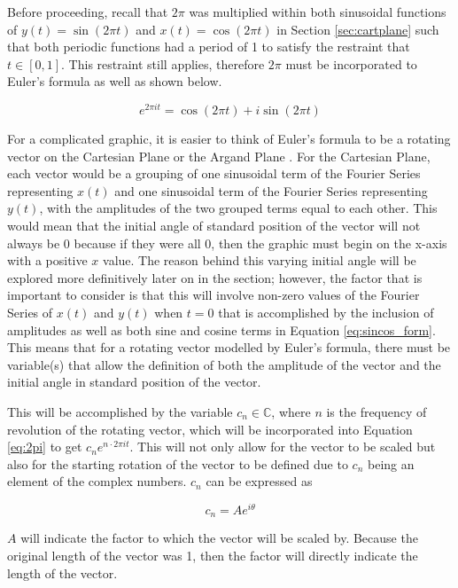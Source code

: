 \documentclass[letterpaper, 12pt]{article}
\begin{document}
Before proceeding, recall that \(2\pi\) was multiplied within
both sinusoidal functions of \(y(t) = \sin (2\pi t)\)
and \(x(t) = \cos (2\pi t)\) in Section \ref*{sec:cartplane}
such that both periodic functions had a period of 1
to satisfy the restraint that \(t \in [0, 1]\).
This restraint still applies, therefore \(2 \pi\)
must be incorporated to Euler's formula as well
as shown below.

\begin{equation}
    e^{2\pi it} = \cos(2\pi t) + i\sin(2\pi t)
    \label{eq:2pi}
\end{equation}

For a complicated graphic,
it is easier to think of Euler's formula to be a rotating vector on the
Cartesian Plane or the
Argand Plane \cite{sandersonWhatFourierSeries2019}.
For the Cartesian Plane, each vector would be a grouping of one
sinusoidal term of the Fourier Series representing \(x(t)\)
and one sinusoidal term of the Fourier Series representing \(y(t)\),
with the amplitudes of the two grouped terms equal to each other. This would mean
that the initial angle of standard position of the vector will not
always be 0 because if they were all 0, then the graphic must begin
on the x-axis with a positive \(x\) value. The reason behind
this varying initial angle will be explored more definitively later on
in the section; however, the factor that is important to consider
is that this will involve non-zero values of the Fourier Series of \(x(t)\) and \(y(t)\) when \(t=0\) that is accomplished by
the inclusion of amplitudes as well as both sine and cosine terms in Equation \ref*{eq:sincos_form}.
This means that for a rotating vector modelled by Euler's formula,
there must be variable(s) that allow the definition of both
the amplitude of the vector and the initial angle in standard
position of the vector.

This will be accomplished by the variable \(c_n \in \mathbb{C}\), where \(n\) is the frequency
of revolution of the rotating vector,
which will be incorporated into Equation \ref*{eq:2pi} to get \(c_n e^{n \cdot 2\pi it}\). This will not
only allow for the vector to be scaled but also for the starting rotation of
the vector to be defined due to \(c_n\) being an element of the
complex numbers. \(c_n\) can be expressed as

\begin{equation*}
    c_n = A e^{i\theta}
\end{equation*}

\(A\) will indicate the factor to which the vector will be scaled by. Because
the original length of the vector was 1, then the factor will directly indicate
the length of the vector.
\end{document}
